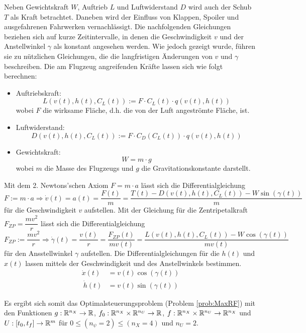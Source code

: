 Neben Gewichtskraft \(W\), Auftrieb \(L\) und Luftwiderstand \(D\) wird auch der Schub \(T\) als Kraft betrachtet. Daneben wird der Einfluss von Klappen, Spoiler und ausgefahrenen Fahrwerken vernachlässigt. Die nachfolgenden Gleichungen beziehen sich auf kurze Zeitintervalle, in denen die Geschwindigkeit $v$ und der Anstellwinkel $\gamma$ als konstant angesehen werden. Wie jedoch gezeigt wurde, führen sie zu nützlichen Gleichungen, die die langfristigen Änderungen von $v$ und $\gamma$ beschreiben. Die am Flugzeug angreifenden Kräfte lassen sich wie folgt berechnen:
\begin{itemize}
    \item Auftriebskraft: \[L(v(t), h(t), C_L(t)) := F \cdot C_L(t) \cdot q(v(t), h(t))\] wobei $F$ die wirksame Fläche, d.h. die von der Luft angeströmte Fläche, ist.
    \item Luftwiderstand: \[D(v(t), h(t), C_L(t)) := F \cdot C_D(C_L(t)) \cdot q(v(t), h(t))\]
    \item Gewichtskraft: \[W = m \cdot g\] wobei $m$ die Masse des Flugzeugs und $g$ die Gravitationskonstante darstellt.
\end{itemize}

Mit dem 2. Newtons'schen Axiom $F = m \cdot a$ lässt sich die Differentialgleichung
\[F := m \cdot a \Rightarrow \dot{v}(t) = a(t) = \dfrac{F(t)}{m} = \dfrac{T(t) - D(v(t),h(t),C_L(t)) - W \sin(\gamma(t))}{m}\]
für die Geschwindigkeit $v$ aufstellen.
Mit der Gleichung für die Zentripetalkraft $F_{ZP} = \dfrac{m v^2}{r}$ lässt sich die Differentialgleichung
\[F_{ZP} := \dfrac{m v^2}{r} \Rightarrow \dot{\gamma}(t) = \dfrac{v(t)}{r} = \dfrac{F_{ZP}(t)}{m v(t)} = \dfrac{L(v(t),h(t),C_L(t)) - W \cos(\gamma(t))}{m v(t)}\]
für den Ansstellwinkel $\gamma$ aufstellen.
Die Differentialgleichungen für die $h(t)$ und $x(t)$ lassen mittels der Geschwindigkeit und des Anstellwinkels bestimmen.
\[\begin{split}
    \dot{x}(t) &= v(t) \cos(\gamma(t))\\\
    \dot{h}(t) &= v(t) \sin(\gamma(t))
\end{split} \]

Es ergibt sich somit das Optimalsteuerungsproblem (Problem \ref{prob:MaxRF}) mit den Funktionen $g : \mathbb{R}^{n_X} \to \mathbb{R}$, $f_0 : \mathbb{R}^{n_X} \times \mathbb{R}^{n_U} \to \mathbb{R}$, $f : \mathbb{R}^{n_X} \times \mathbb{R}^{n_U} \to \mathbb{R}^{n_X}$ und $U : [t_0,t_f] \to \mathbb{R}^m$ für $0 \leq (n_{\psi} = 2) \leq (n_X = 4)$ und $n_U = 2$.

